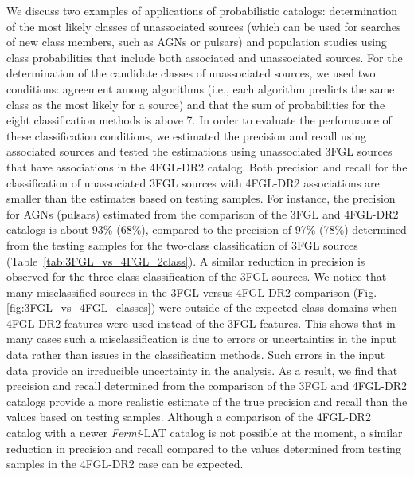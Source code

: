 \documentclass[referee]{aa} %
\newcommand{\Fermi}{\textit{Fermi}\xspace}
\begin{document}
We discuss two examples of applications of probabilistic catalogs: determination of the most likely classes of unassociated sources (which can be used for searches of new class members, such as AGNs or pulsars) and population studies using class probabilities that include both associated and unassociated sources.
For the determination of the candidate classes of unassociated sources, we used two conditions: agreement among algorithms (i.e., each algorithm predicts the same class as the most likely for a source) and that the sum of probabilities for the eight classification methods is above 7.
In order to evaluate the performance of these classification conditions, we estimated the precision and recall using associated sources and tested the estimations using unassociated 3FGL sources that have associations in the 4FGL-DR2 catalog.
Both precision and recall for the classification of unassociated 3FGL sources with 4FGL-DR2 associations 
are smaller than the estimates based on testing samples.
For instance, the precision for AGNs (pulsars) estimated from the comparison of the 3FGL and 4FGL-DR2 catalogs is about 93\% (68\%),
compared to the precision of 97\% (78\%) determined from the testing samples for the two-class classification of 3FGL sources (Table~\ref{tab:3FGL_vs_4FGL_2class}).
A similar reduction in precision is observed for the three-class classification of the 3FGL sources.
We notice that many misclassified sources in the 3FGL versus 4FGL-DR2 comparison (Fig. \ref{fig:3FGL_vs_4FGL_classes}) were outside of the expected class domains when 4FGL-DR2 features were used instead of the 3FGL features. This shows that in many cases such a misclassification is due to errors or uncertainties in the input data rather than issues in the classification methods. Such errors in the input data provide an irreducible uncertainty in the analysis. As a result, we find that precision and recall determined from the comparison of the 3FGL and 4FGL-DR2 catalogs provide a more realistic estimate of the true precision and recall than the values based on testing samples.
Although a comparison of the 4FGL-DR2 catalog with a newer \Fermi-LAT catalog is not possible at the moment, 
a similar reduction in precision and recall compared to the values determined from testing samples in the 4FGL-DR2 case can be expected.
\end{document}
